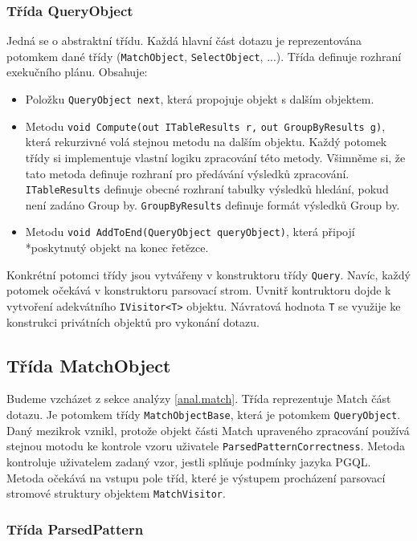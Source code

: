 \subsubsection{Třída QueryObject}

Jedná se o abstraktní třídu.
Každá hlavní část dotazu je reprezentována potomkem dané třídy (\texttt{MatchObject}, \texttt{SelectObject}, ...).
Třída definuje rozhraní exekučního plánu.
Obsahuje:
\begin{itemize}
\item Položku \texttt{QueryObject next}, která propojuje objekt s dalším objektem.
\item Metodu \texttt{void Compute(out ITableResults r,} \texttt{out GroupByResults g)}, která rekurzivné volá stejnou metodu na dalším objektu.
Každý potomek třídy si implementuje vlastní logiku zpracování této metody.
Všimněme si, že tato metoda definuje rozhraní pro předávání výsledků zpracování.
\texttt{ITableResults} definuje obecné rozhraní tabulky výsledků hledání, pokud není zadáno Group by.
\texttt{GroupByResults} definuje formát výsledků Group by.
\item Metodu \texttt{void AddToEnd(QueryObject queryObject)}, která připojí \\*poskytnutý objekt na konec řetězce.
\end{itemize}
Konkrétní potomci třídy jsou vytvářeny v konstruktoru třídy \texttt{Query}.
Navíc, každý potomek očekává v konstruktoru parsovací strom.
Uvnitř kontruktoru dojde k vytvoření adekvátního \texttt{IVisitor<T>} objektu.
Návratová hodnota \texttt{T} se využije ke konstrukci privátních objektů pro vykonání dotazu.

\subsection{Třída MatchObject}

Budeme vzcházet z sekce analýzy \ref{anal.match}.
Třída reprezentuje Match část dotazu.
Je potomkem třídy \texttt{MatchObjectBase}, která je potomkem \texttt{QueryObject}.
Daný mezikrok vznikl, protože objekt části Match upraveného zpracování používá stejnou motodu ke kontrole vzoru uživatele \texttt{ParsedPatternCorrectness}.
Metoda kontroluje uživatelem zadaný vzor, jestli splňuje podmínky jazyka PGQL. 
Metoda očekává na vstupu pole tříd, které je výstupem procházení parsovací stromové struktury objektem \texttt{MatchVisitor}. 

\subsubsection{Třída ParsedPattern}

